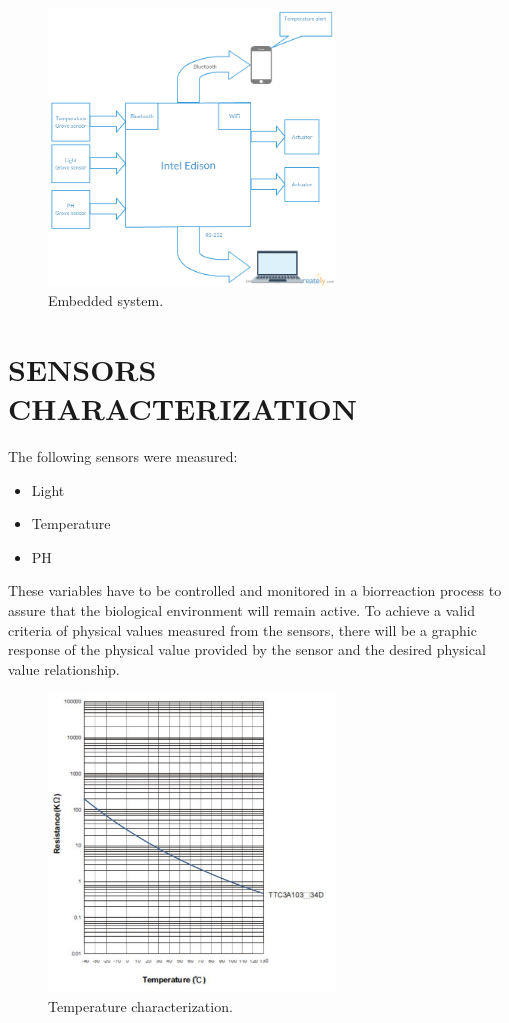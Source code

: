 \documentclass[journal]{IEEEtran}  %
\begin{document}
\begin{figure}[h]
	\centering
	\captionsetup{justification=centering}
	\includegraphics[width=3in]{Embedded_bio.png}
	\caption{Embedded system.}
	\label{fig:figure1}
\end{figure}

\section{SENSORS CHARACTERIZATION}
The following sensors were measured:
	\begin{itemize}
		\item Light
		\item Temperature
		\item PH
	\end{itemize}

These variables have to be controlled and monitored in a biorreaction process to assure that the biological environment will remain active. To achieve a valid criteria of physical values measured from the sensors, there will be a graphic response of the physical value provided by the sensor and the desired physical value relationship.

\begin{figure}
	\centering
	\captionsetup{justification=centering}
	\includegraphics[width=3in]{temp.jpg}
	\caption{Temperature characterization.}
	\label{fig:figure2}
\end{figure}
\end{document}
